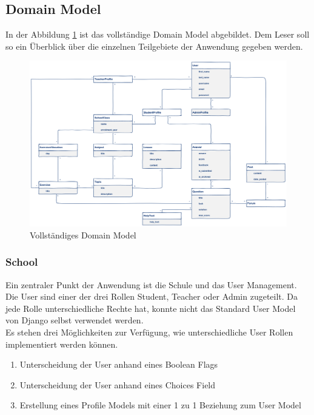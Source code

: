 \subsection{Domain Model}
In der Abbildung \ref{fig:domain_model_full} ist das vollständige Domain Model abgebildet. Dem Leser soll so ein Überblick über die einzelnen Teilgebiete der Anwendung gegeben werden.

	\begin{figure}[H]
	\begin{center}
	
		\includegraphics[width=1.4\textwidth, keepaspectratio, angle=90]{images/domain_model_full.png}
  		\caption{Vollständiges Domain Model}
		\label{fig:domain_model_full}
		\end{center}
\end{figure}

\newpage

\subsubsection*{School}
Ein zentraler Punkt der Anwendung ist die Schule und das User Management. Die User sind einer der drei Rollen Student, Teacher oder Admin zugeteilt. Da jede Rolle unterschiedliche Rechte hat, konnte nicht das Standard User Model von Django selbst verwendet werden. \\
Es stehen drei Möglichkeiten zur Verfügung, wie unterschiedliche User Rollen implementiert werden können.

\begin{enumerate}
	\item Unterscheidung der User anhand eines Boolean Flags
	\item Unterscheidung der User anhand eines Choices Field 
	\item Erstellung eines Profile Models mit einer 1 zu 1 Beziehung zum User Model
\end{enumerate}

